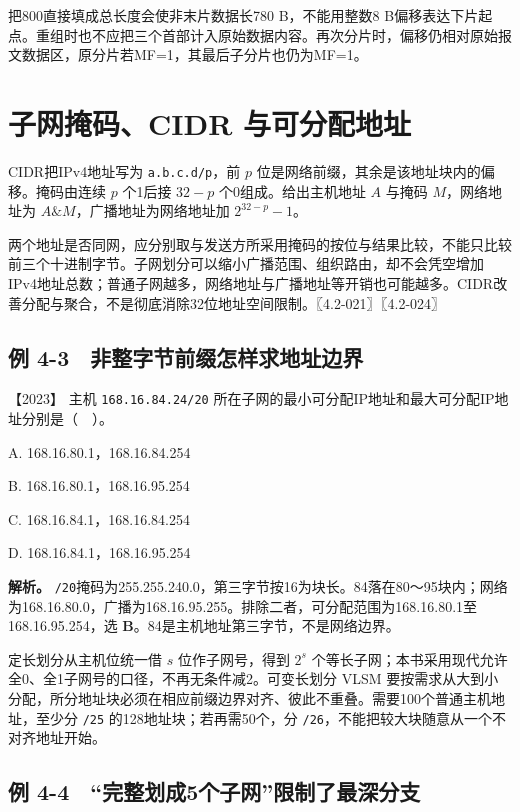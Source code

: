把800直接填成总长度会使非末片数据长780 B，不能用整数8 B偏移表达下片起点。重组时也不应把三个首部计入原始数据内容。再次分片时，偏移仍相对原始报文数据区，原分片若MF=1，其最后子分片也仍为MF=1。

\section{子网掩码、CIDR 与可分配地址}\label{cn-04-08}

CIDR把IPv4地址写为 \texttt{a.b.c.d/p}，前 \(p\) 位是网络前缀，其余是该地址块内的偏移。掩码由连续 \(p\) 个1后接 \(32-p\) 个0组成。给出主机地址 \(A\) 与掩码 \(M\)，网络地址为 \(A\&M\)，广播地址为网络地址加 \(2^{32-p}-1\)。

两个地址是否同网，应分别取与发送方所采用掩码的按位与结果比较，不能只比较前三个十进制字节。子网划分可以缩小广播范围、组织路由，却不会凭空增加IPv4地址总数；普通子网越多，网络地址与广播地址等开销也可能越多。CIDR改善分配与聚合，不是彻底消除32位地址空间限制。〖4.2-021〗〖4.2-024〗

\subsection{例 4-3　非整字节前缀怎样求地址边界}\label{cn-ex4-3}

\noindent{}【2023】 主机 \texttt{168.16.84.24/20} 所在子网的最小可分配IP地址和最大可分配IP地址分别是（　）。

A. 168.16.80.1，168.16.84.254

B. 168.16.80.1，168.16.95.254

C. 168.16.84.1，168.16.84.254

D. 168.16.84.1，168.16.95.254


\textbf{解析。} \texttt{/20}掩码为255.255.240.0，第三字节按16为块长。84落在80～95块内；网络为168.16.80.0，广播为168.16.95.255。排除二者，可分配范围为168.16.80.1至168.16.95.254，选 \textbf{B}。84是主机地址第三字节，不是网络边界。

定长划分从主机位统一借 \(s\) 位作子网号，得到 \(2^s\) 个等长子网；本书采用现代允许全0、全1子网号的口径，不再无条件减2。可变长划分 VLSM 要按需求从大到小分配，所分地址块必须在相应前缀边界对齐、彼此不重叠。需要100个普通主机地址，至少分 \texttt{/25} 的128地址块；若再需50个，分 \texttt{/26}，不能把较大块随意从一个不对齐地址开始。

\subsection{例 4-4　``完整划成5个子网''限制了最深分支}\label{cn-ex4-4}

